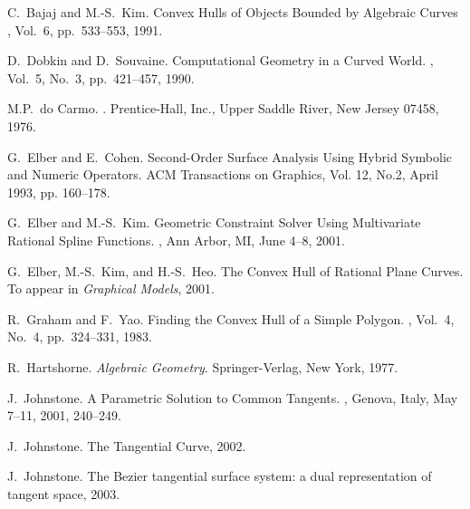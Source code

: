 \documentclass[doublespacing]{elsart}
\begin{document}
\begin{thebibliography}{}


C.~Bajaj and M.-S.~Kim.
\newblock Convex Hulls of Objects Bounded by Algebraic Curves
, Vol.~6, pp.~533--553, 1991.

D.~Dobkin and D.~Souvaine.
\newblock Computational Geometry in a Curved World.
, Vol.~5, No.~3, pp.~421--457, 1990.

M.P.~do Carmo.
.
\newblock Prentice-Hall, Inc., Upper Saddle River, New Jersey 07458, 1976.

G.~Elber and E.~Cohen.
\newblock Second-Order Surface Analysis Using Hybrid Symbolic and
Numeric Operators.
\newblock ACM Transactions on Graphics, Vol. 12, No.2, April 1993, 
pp. 160--178.

G.~Elber and M.-S.~Kim.
\newblock Geometric Constraint Solver
Using Multivariate Rational Spline Functions.
,
Ann Arbor, MI, June 4--8, 2001.

G.~Elber, M.-S.~Kim, and H.-S.~Heo.
\newblock The Convex Hull of Rational Plane Curves.
\newblock To appear in {\em Graphical Models\/}, 2001.

R.~Graham and F.~Yao.
\newblock Finding the Convex Hull of a Simple Polygon.
, Vol.~4, No.~4, pp.~324--331, 1983.

R.~Hartshorne.
{\em Algebraic Geometry}. Springer-Verlag, New York, 1977.

J.~Johnstone.
\newblock A Parametric Solution to Common Tangents.
,
Genova, Italy, May 7--11, 2001, 240--249.

J.~Johnstone.
The Tangential Curve, 2002.

J.~Johnstone.
The Bezier tangential surface system: a dual representation of tangent space,
2003.


\end{thebibliography}
\end{document}
